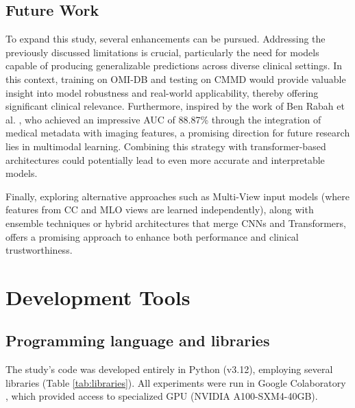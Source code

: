 \documentclass[a4paper,10pt]{book}
\begin{document}
\section{Future Work}

To expand this study, several enhancements can be pursued. Addressing the previously discussed limitations is crucial, particularly the need for models capable of producing generalizable predictions across diverse clinical settings. In this context, training on OMI-DB and testing on CMMD would provide valuable insight into model robustness and real-world applicability, thereby offering significant clinical relevance. Furthermore, inspired by the work of Ben Rabah et al. \cite{ben_rabah_multimodal_2025}, who achieved an impressive AUC of 88.87\% through the integration of medical metadata with imaging features, a promising direction for future research lies in multimodal learning. Combining this strategy with transformer-based architectures could potentially lead to even more accurate and interpretable models.

Finally, exploring alternative approaches such as Multi-View input models (where features from CC and MLO views are learned independently), along with ensemble techniques or hybrid architectures that merge CNNs and Transformers, offers a promising approach to enhance both performance and clinical trustworthiness.


\appendix

\chapter{Development Tools}

\section{Programming language and libraries}

The study's code was developed entirely in Python (v3.12), employing several libraries (Table \ref{tab:libraries}). All experiments were run in Google Colaboratory \cite{GoogleColab}, which provided access to specialized GPU (NVIDIA A100-SXM4-40GB).
\end{document}
